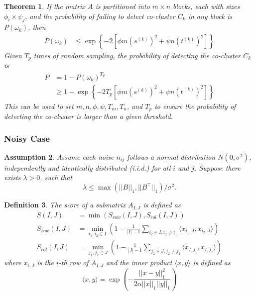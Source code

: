 \documentclass[journal]{IEEEtran}
\newtheorem{theorem}{Theorem}
\newtheorem{definition}[theorem]{Definition}
\newtheorem{assumption}[theorem]{Assumption}
\begin{document}
\begin{theorem}
  \label{thm:probability_co_cluster_detection}
  If the matrix $A$ is partitioned into $m \times n$ blocks, each with sizes $\phi_i \times \psi_j$, and the probability of failing to detect co-cluster $C_k$ in any block is $P(\omega_k)$, then
  \begin{align*}
    P(\omega_k) & \le \exp \left\{ -2 [\phi m (s^{(k)})^2 + \psi n (t^{(k)})^2] \right\}
  \end{align*}
  Given $T_p$ times of random sampling, the probability of detecting the co-cluster $C_k$ is
  \begin{align*}
    P & = 1 - P(\omega_k)^{T_p}                                                        \\
      & \ge 1 - \exp \left\{ -2 T_p [\phi m (s^{(k)})^2 + \psi n (t^{(k)})^2] \right\}
  \end{align*}
  This can be used to set $m, n, \phi, \psi, T_m, T_n$, and $T_p$ to ensure the probability of detecting the co-cluster is larger than a given threshold.
\end{theorem}

\subsubsection{Noisy Case}
\begin{assumption}
  Assume each noise $n_{ij}$ follows a normal distribution $N(0, \sigma^2)$, independently and identically distributed (i.i.d.) for all $i$ and $j$. Suppose there exists $\lambda > 0$, such that
  $$\lambda \le \max(||B||_1, ||B^\top||_1)/\sigma^2.$$
\end{assumption}

\begin{definition}
  The score of a submatrix $A_{I,J}$ is defined as
  \begin{align}
    S(I,J)       & = \min(S_{row}(I,J), S_{col}(I,J))                                                                                          \\
    S_{row}(I,J) & = \min_{i_1, i_2 \in I} \left(1- \frac{1}{|I|-1} \sum_{i_2 \in I, i_2 \neq i_1} \langle x_{i_1,J}, x_{i_2,J}\rangle \right) \\
    S_{col}(I,J) & = \min_{j_1, j_2 \in J} \left(1- \frac{1}{|J|-1} \sum_{j_2 \in J, j_2 \neq j_1} \langle x_{I,j_1}, x_{I,j_2}\rangle \right)
  \end{align}
  where $x_{i,J}$ is the $i$-th row of $A_{I,J}$ and the inner product $\langle x, y \rangle$ is defined as
  $$\langle x, y \rangle = \exp(-\frac{||x - y||_1^2}{2\alpha||x||_1||y||_1})$$
\end{definition}
\end{document}
